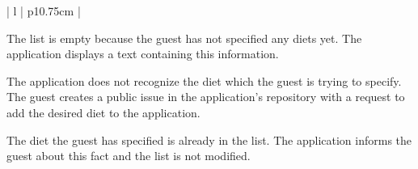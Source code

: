 \begin{center}
\begin{tabular}{| l | p{10.75cm} | }
\begin{minipage}[t]{\linewidth}
\begin{description}[nosep,after=\strut]
        \item [A1:] The list is empty because the guest has not specified any diets yet. The application displays a text containing this information.
        \item [A2:] The application does not recognize the diet which the guest is trying to specify. The guest creates a public issue in the application's repository with a request to add the desired diet to the application.
        \item [A3:] The diet the guest has specified is already in the list. The application informs the guest about this fact and the list is not modified.
      \end{description}
    \end{minipage}
    \\
    \hline
  \end{tabular}
  \newline
\end{center}

